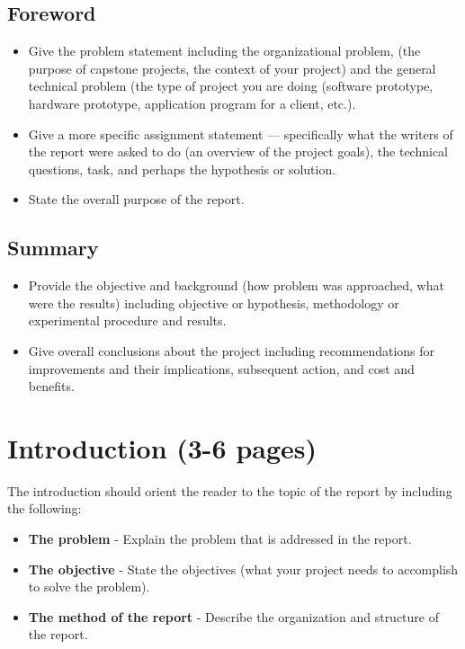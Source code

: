 \documentclass[12pt]{article}
\begin{document}
\subsection*{Foreword}
\begin{itemize}[noitemsep]
    \item Give the problem statement including the organizational problem, (the purpose of capstone projects, the context of your project) and the general technical problem (the type of project you are doing (software prototype, hardware prototype, application program for a client, etc.).
    \item Give a more specific assignment statement --- specifically what the writers of the report were asked to do (an overview of the project goals), the technical questions, task, and perhaps the hypothesis or solution.
    \item State the overall purpose of the report.
\end{itemize}

\subsection*{Summary}
\begin{itemize}[noitemsep]
    \item Provide the objective and background (how problem was approached, what were the results) including objective or hypothesis, methodology or experimental procedure and results.
    \item Give overall conclusions about the project including recommendations for improvements and their implications, subsequent action, and cost and benefits.
\end{itemize}

\tableofcontents
\newpage

\section{Introduction (3-6 pages)}
The introduction should orient the reader to the topic of the report by including the following:
\begin{itemize}[noitemsep]
    \item \textbf{The problem} - Explain the problem that is addressed in the report.
    \item \textbf{The objective} - State the objectives (what your project needs to accomplish to solve the problem).
    \item \textbf{The method of the report} - Describe the organization and structure of the report.
\end{itemize}
\end{document}
